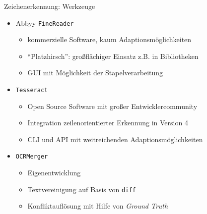 \documentclass{bbawslides}
\begin{document}
\begin{bbawslide}{Zeichenerkennung: Werkzeuge}
  \vspace*{7mm}%
  \centerslidestrue%
  \begin{itemize}
    \item Abbyy \texttt{FineReader}
    \begin{itemize}\small
      \item kommerzielle Software, kaum Adaptionsmöglichkeiten
      \item \enquote{Platzhirsch}: großflächiger Einsatz z.B. in Bibliotheken
      \item GUI mit Möglichkeit der Stapelverarbeitung
    \end{itemize}
    \item \texttt{Tesseract} 
    \begin{itemize}\small
      \item Open Source Software mit großer Entwicklercommunity
      \item Integration zeilenorientierter Erkennung in Version 4
      \item CLI und API mit weitreichenden Adaptionsmöglichkeiten
    \end{itemize}
    \item \texttt{OCRMerger} 
    \begin{itemize}\small
      \item Eigenentwicklung
      \item Textvereinigung auf Basis von \texttt{diff}
      \item Konfliktauflösung mit Hilfe von \emph{Ground Truth}
    \end{itemize}
  \end{itemize}
\end{bbawslide}
\end{document}
